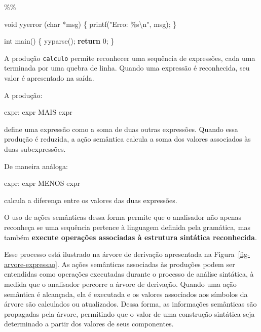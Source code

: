 \documentclass[
  brazilian,
  letterpaper,
]{book}
\newenvironment{Shaded}{\begin{snugshade}}{\end{snugshade}}
\newcommand{\ControlFlowTok}[1]{\textcolor[rgb]{0.00,0.23,0.31}{\textbf{#1}}}
\newcommand{\DataTypeTok}[1]{\textcolor[rgb]{0.68,0.00,0.00}{#1}}
\newcommand{\DecValTok}[1]{\textcolor[rgb]{0.68,0.00,0.00}{#1}}
\newcommand{\NormalTok}[1]{\textcolor[rgb]{0.00,0.23,0.31}{#1}}
\newcommand{\OperatorTok}[1]{\textcolor[rgb]{0.37,0.37,0.37}{#1}}
\newcommand{\SpecialCharTok}[1]{\textcolor[rgb]{0.37,0.37,0.37}{#1}}
\newcommand{\StringTok}[1]{\textcolor[rgb]{0.13,0.47,0.30}{#1}}
\theoremstyle{plain}
\theoremstyle{definition}
\theoremstyle{remark}
\begin{document}
\begin{Shaded}
\begin{Highlighting}[]
\OperatorTok{\%\%}

\DataTypeTok{void}\NormalTok{ yyerror }\OperatorTok{(}\DataTypeTok{char} \OperatorTok{*}\NormalTok{msg}\OperatorTok{)} \OperatorTok{\{}
\NormalTok{    printf}\OperatorTok{(}\StringTok{"Erro: }\SpecialCharTok{\%s\textbackslash{}n}\StringTok{"}\OperatorTok{,}\NormalTok{ msg}\OperatorTok{);}
\OperatorTok{\}} 

\DataTypeTok{int}\NormalTok{ main}\OperatorTok{()} \OperatorTok{\{}
\NormalTok{    yyparse}\OperatorTok{();}
    \ControlFlowTok{return} \DecValTok{0}\OperatorTok{;}
\OperatorTok{\}}
\end{Highlighting}
\end{Shaded}

A produção \texttt{calculo} permite reconhecer uma sequência de
expressões, cada uma terminada por uma quebra de linha. Quando uma
expressão é reconhecida, seu valor é apresentado na saída.

A produção:

\begin{Shaded}
\begin{Highlighting}[]
\NormalTok{expr}\OperatorTok{:}\NormalTok{ expr MAIS expr}
\end{Highlighting}
\end{Shaded}

define uma expressão como a soma de duas outras expressões. Quando essa
produção é reduzida, a ação semântica calcula a soma dos valores
associados às duas subexpressões.

De maneira análoga:

\begin{Shaded}
\begin{Highlighting}[]
\NormalTok{expr}\OperatorTok{:}\NormalTok{ expr MENOS expr}
\end{Highlighting}
\end{Shaded}

calcula a diferença entre os valores das duas expressões.

O uso de ações semânticas dessa forma permite que o analisador não
apenas reconheça se uma sequência pertence à linguagem definida pela
gramática, mas também \textbf{execute operações associadas à estrutura
sintática reconhecida}.

Esse processo está ilustrado na árvore de derivação apresentada na
Figura~\ref{fig-arvore-expressao}. As ações semânticas associadas às
produções podem ser entendidas como operações executadas durante o
processo de análise sintática, à medida que o analisador percorre a
árvore de derivação. Quando uma ação semântica é alcançada, ela é
executada e os valores associados aos símbolos da árvore são calculados
ou atualizados. Dessa forma, as informações semânticas são propagadas
pela árvore, permitindo que o valor de uma construção sintática seja
determinado a partir dos valores de seus componentes.
\end{document}

